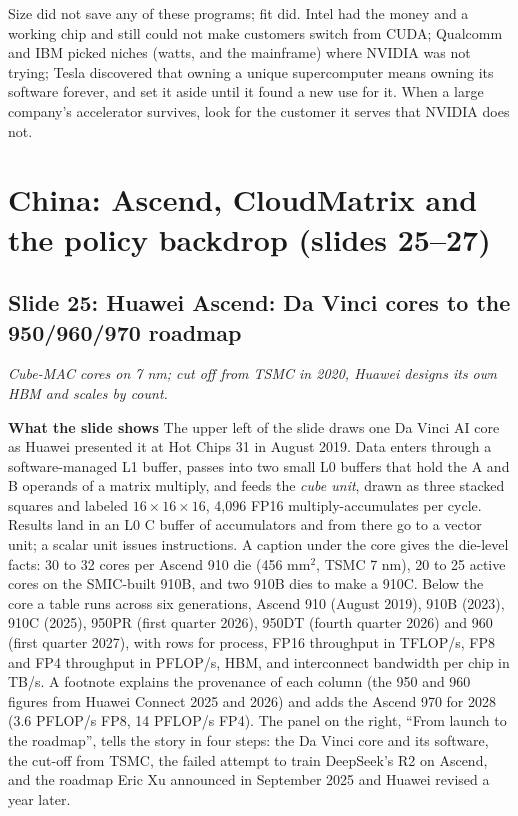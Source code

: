\documentclass[11pt,letterpaper]{article}
\newcommand{\setstage}[1]{\colorlet{stagec}{#1}}
\newcommand{\slide}[3]{%
  \subsection[Slide #1: #2]{Slide #1: #2}%
  {\color{muted}\itshape #3\par}\medskip}
\newcommand{\para}[1]{\medskip\noindent\textbf{#1}\quad}
\newenvironment{intuition}{\begin{tcolorbox}[intuitionbox]}{\end{tcolorbox}}
\begin{document}
\begin{intuition}
Size did not save any of these programs; fit did. Intel had the money and a working chip and still could not make customers switch from CUDA; Qualcomm and IBM picked niches (watts, and the mainframe) where NVIDIA was not trying; Tesla discovered that owning a unique supercomputer means owning its software forever, and set it aside until it found a new use for it. When a large company's accelerator survives, look for the customer it serves that NVIDIA does not.
\end{intuition}
\setstage{trn}
\section{China: Ascend, CloudMatrix and the policy backdrop (slides 25--27)}

\slide{25}{Huawei Ascend: Da Vinci cores to the 950/960/970 roadmap}{Cube-MAC cores on 7 nm; cut off from TSMC in 2020, Huawei designs its own HBM and scales by count.}

\para{What the slide shows} The upper left of the slide draws one Da Vinci AI core as Huawei presented it at Hot Chips 31 in August 2019. Data enters through a software-managed L1 buffer, passes into two small L0 buffers that hold the A and B operands of a matrix multiply, and feeds the \emph{cube unit}, drawn as three stacked squares and labeled $16\times16\times16$, 4{,}096 FP16 multiply-accumulates per cycle. Results land in an L0 C buffer of accumulators and from there go to a vector unit; a scalar unit issues instructions. A caption under the core gives the die-level facts: 30 to 32 cores per Ascend 910 die (456 mm$^2$, TSMC 7 nm), 20 to 25 active cores on the SMIC-built 910B, and two 910B dies to make a 910C. Below the core a table runs across six generations, Ascend 910 (August 2019), 910B (2023), 910C (2025), 950PR (first quarter 2026), 950DT (fourth quarter 2026) and 960 (first quarter 2027), with rows for process, FP16 throughput in TFLOP/s, FP8 and FP4 throughput in PFLOP/s, HBM, and interconnect bandwidth per chip in TB/s. A footnote explains the provenance of each column (the 950 and 960 figures from Huawei Connect 2025 and 2026) and adds the Ascend 970 for 2028 (3.6 PFLOP/s FP8, 14 PFLOP/s FP4). The panel on the right, ``From launch to the roadmap'', tells the story in four steps: the Da Vinci core and its software, the cut-off from TSMC, the failed attempt to train DeepSeek's R2 on Ascend, and the roadmap Eric Xu announced in September 2025 and Huawei revised a year later.
\end{document}
